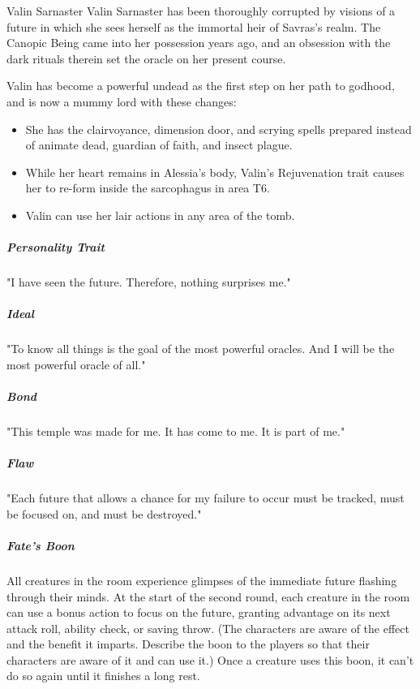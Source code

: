 \documentclass[10pt,a4paper,twoside,bg=print,twocolumn,openany,nodeprecatedcode]{dndbook}
\begin{document}
\begin{DndSidebar}[float=!b]{Valin Sarnaster}
Valin Sarnaster has been thoroughly corrupted by visions of a future in which she sees herself as the immortal heir of Savras's realm. The Canopic Being came into her possession years ago, and an obsession with the dark rituals therein set the oracle on her present course.



Valin has become a powerful undead as the first step on her path to godhood, and is now a mummy lord with these changes:




\begin{itemize}
\item She has the clairvoyance, dimension door, and scrying spells prepared instead of animate dead, guardian of faith, and insect plague.
\item While her heart remains in Alessia's body, Valin's Rejuvenation trait causes her to re-form inside the sarcophagus in area T6.
\item Valin can use her lair actions in any area of the tomb.
\end{itemize}



\subparagraph{Personality Trait}
"I have seen the future. Therefore, nothing surprises me."



\subparagraph{Ideal}
"To know all things is the goal of the most powerful oracles. And I will be the most powerful oracle of all."



\subparagraph{Bond}
"This temple was made for me. It has come to me. It is part of me."



\subparagraph{Flaw}
"Each future that allows a chance for my failure to occur must be tracked, must be focused on, and must be destroyed."



\end{DndSidebar}

\subparagraph{Fate's Boon}
All creatures in the room experience glimpses of the immediate future flashing through their minds. At the start of the second round, each creature in the room can use a bonus action to focus on the future, granting advantage on its next attack roll, ability check, or saving throw. (The characters are aware of the effect and the benefit it imparts. Describe the boon to the players so that their characters are aware of it and can use it.) Once a creature uses this boon, it can't do so again until it finishes a long rest.
\end{document}
